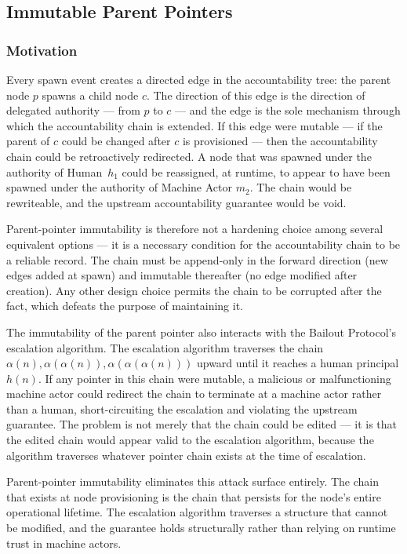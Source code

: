 \subsection{Immutable Parent Pointers}\label{sec:immutable-parent-pointers}

\subsubsection{Motivation}\label{sec:parent-pointer-motivation}

Every spawn event creates a directed edge in the accountability tree: the parent node $p$ spawns a child node $c$. The direction of this edge is the direction of delegated authority --- from $p$ to $c$ --- and the edge is the sole mechanism through which the accountability chain is extended. If this edge were mutable --- if the parent of $c$ could be changed after $c$ is provisioned --- then the accountability chain could be retroactively redirected. A node that was spawned under the authority of Human~$h_1$ could be reassigned, at runtime, to appear to have been spawned under the authority of Machine Actor $m_2$. The chain would be rewriteable, and the upstream accountability guarantee would be void.

Parent-pointer immutability is therefore not a hardening choice among several equivalent options --- it is a necessary condition for the accountability chain to be a reliable record. The chain must be append-only in the forward direction (new edges added at spawn) and immutable thereafter (no edge modified after creation). Any other design choice permits the chain to be corrupted after the fact, which defeats the purpose of maintaining it.

The immutability of the parent pointer also interacts with the Bailout Protocol's escalation algorithm. The escalation algorithm traverses the chain $\alpha(n), \alpha(\alpha(n)), \alpha(\alpha(\alpha(n)))$ upward until it reaches a human principal $h(n)$. If any pointer in this chain were mutable, a malicious or malfunctioning machine actor could redirect the chain to terminate at a machine actor rather than a human, short-circuiting the escalation and violating the upstream guarantee. The problem is not merely that the chain could be edited --- it is that the edited chain would appear valid to the escalation algorithm, because the algorithm traverses whatever pointer chain exists at the time of escalation.

Parent-pointer immutability eliminates this attack surface entirely. The chain that exists at node provisioning is the chain that persists for the node's entire operational lifetime. The escalation algorithm traverses a structure that cannot be modified, and the guarantee holds structurally rather than relying on runtime trust in machine actors.

